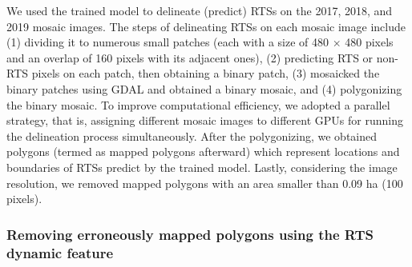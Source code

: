 \documentclass[authoryear,preprint,review,12pt]{elsarticle}
\begin{document}

We used the trained model to delineate (predict) RTSs on the 2017, 2018, and 2019 mosaic images. 
The steps of delineating RTSs on each mosaic image include
(1) dividing it to numerous small patches (each with a size of 480 $\times$ 480 pixels and an overlap of 160 pixels with its adjacent ones),
(2) predicting RTS or non-RTS pixels on each patch, then obtaining a binary patch,
(3) mosaicked the binary patches using GDAL and obtained a binary mosaic, and %
(4) polygonizing the binary mosaic.  %
To improve computational efficiency, we adopted a parallel strategy, that is, assigning different mosaic images to different GPUs for running the delineation process simultaneously. 
After the polygonizing, we obtained polygons (termed as mapped polygons afterward) which represent locations and boundaries of RTSs predict by the trained model. 
Lastly, considering the image resolution, we removed mapped polygons with an area smaller than 0.09 ha (100 pixels). %

\subsubsection{Removing erroneously mapped polygons using the RTS dynamic feature}
\label{sec_improving_using_rts_dynamic}
\end{document}
